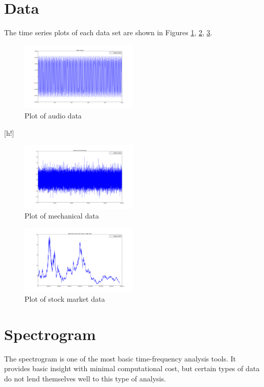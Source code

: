 \documentclass[journal]{IEEEtran}
\begin{document}
\section{Data}
The time series plots of each data set are shown in Figures \ref{fig:WAV}, \ref{fig:Mat}, \ref{fig:Stock}.
\begin{figure}[h!]
\centering
  \includegraphics[width=0.5\textwidth]{wav_plot.png}
\caption{Plot of audio data}
\label{fig:WAV}
\end{figure}[h!]
\begin{figure}
\centering
  \includegraphics[width=0.5\textwidth]{matfile_plot.png}
\caption{Plot of mechanical data}
\label{fig:Mat}
\end{figure}
\begin{figure}[h!]
\centering
  \includegraphics[width=0.5\textwidth]{stock_plot.png}
\caption{Plot of stock market data}
\label{fig:Stock}
\end{figure}

\section{Spectrogram}
The spectrogram is one of the most basic time-frequency analysis tools. It provides basic insight with minimal computational cost, but certain
types of data do not lend themselves well to this type of analysis.
\end{document}
